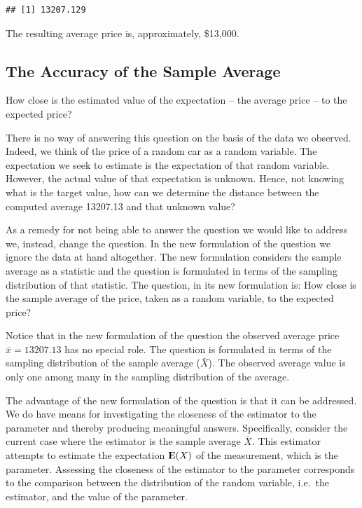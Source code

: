 \documentclass[]{krantz}
\makeatletter
\newenvironment{Shaded}{\begin{snugshade}}{\end{snugshade}}
\newcommand{\KeywordTok}[1]{\textcolor[rgb]{0.13,0.29,0.53}{\textbf{#1}}}
\newcommand{\DataTypeTok}[1]{\textcolor[rgb]{0.13,0.29,0.53}{#1}}
\newcommand{\OtherTok}[1]{\textcolor[rgb]{0.56,0.35,0.01}{#1}}
\newcommand{\OperatorTok}[1]{\textcolor[rgb]{0.81,0.36,0.00}{\textbf{#1}}}
\newcommand{\NormalTok}[1]{#1}
\newcommand{\Expec}{{\rm I\kern-.3em E}}
\newenvironment{kframe}{%
\medskip{}
\setlength{\fboxsep}{.8em}
 \def\at@end@of@kframe{}%
 \ifinner\ifhmode%
  \def\at@end@of@kframe{\end{minipage}}%
  \begin{minipage}{\columnwidth}%
 \fi\fi%
 \def\FrameCommand##1{\hskip\@totalleftmargin \hskip-\fboxsep
 \colorbox{shadecolor}{##1}\hskip-\fboxsep
     \hskip-\linewidth \hskip-\@totalleftmargin \hskip\columnwidth}%
 \MakeFramed {\advance\hsize-\width
   \@totalleftmargin\z@ \linewidth\hsize
   \@setminipage}}%
 {\par\unskip\endMakeFramed%
 \at@end@of@kframe}
\renewenvironment{Shaded}{\begin{kframe}}{\end{kframe}}
\theoremstyle{definition}
\theoremstyle{definition}
\theoremstyle{definition}
\theoremstyle{remark}
\makeatother
\begin{document}
\begin{Shaded}
\end{Shaded}

\begin{verbatim}
## [1] 13207.129
\end{verbatim}

The resulting average price is, approximately, \$13,000.

\subsection{The Accuracy of the Sample
Average}\label{the-accuracy-of-the-sample-average}

How close is the estimated value of the expectation -- the average price
-- to the expected price?

There is no way of answering this question on the basis of the data we
observed. Indeed, we think of the price of a random car as a random
variable. The expectation we seek to estimate is the expectation of that
random variable. However, the actual value of that expectation is
unknown. Hence, not knowing what is the target value, how can we
determine the distance between the computed average 13207.13 and that
unknown value?

As a remedy for not being able to answer the question we would like to
address we, instead, change the question. In the new formulation of the
question we ignore the data at hand altogether. The new formulation
considers the sample average as a statistic and the question is
formulated in terms of the sampling distribution of that statistic. The
question, in its new formulation is: How close is the sample average of
the price, taken as a random variable, to the expected price?

Notice that in the new formulation of the question the observed average
price \(\bar x = 13207.13\) has no special role. The question is
formulated in terms of the sampling distribution of the sample average
(\(\bar X\)). The observed average value is only one among many in the
sampling distribution of the average.

The advantage of the new formulation of the question is that it can be
addressed. We do have means for investigating the closeness of the
estimator to the parameter and thereby producing meaningful answers.
Specifically, consider the current case where the estimator is the
sample average \(\bar X\). This estimator attempts to estimate the
expectation \(\Expec(X)\) of the measurement, which is the parameter.
Assessing the closeness of the estimator to the parameter corresponds to
the comparison between the distribution of the random variable, i.e.~the
estimator, and the value of the parameter.
\end{document}
